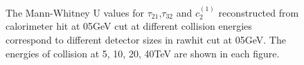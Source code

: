 \documentclass[final,1p,11pt]{elsarticle}
\begin{document}
\begin{figure}
\begin{center}
\end{center}
\caption{The Mann-Whitney U values for $\tau_{21}$,$\tau_{32}$ and $c_2^{(1)}$ reconstructed from calorimeter hit at 05GeV cut at different collision energies correspond to different detector sizes in rawhit cut at 05GeV. The energies of collision at 5, 10, 20, 40TeV are shown in each figure.}
\label{fig:raw_U_summary}
\end{figure}
\end{document}
